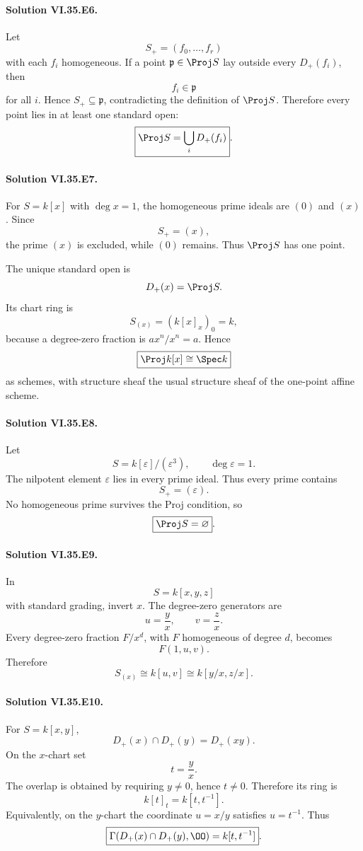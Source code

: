 \paragraph{Solution VI.35.E6.}
Let
\[
S_+=(f_0,\ldots,f_r)
\]
with each \(f_i\) homogeneous. If a point \(\mathfrak p\in\Proj S\) lay outside every \(D_+(f_i)\), then
\[
f_i\in\mathfrak p
\]
for all \(i\). Hence \(S_+\subseteq\mathfrak p\), contradicting the definition of \(\Proj S\). Therefore every
point lies in at least one standard open:
\[
\boxed{\Proj S=\bigcup_iD_+(f_i)}.
\]

\paragraph{Solution VI.35.E7.}
For \(S=k[x]\) with \(\deg x=1\), the homogeneous prime ideals are \((0)\) and \((x)\). Since
\[
S_+=(x),
\]
the prime \((x)\) is excluded, while \((0)\) remains. Thus \(\Proj S\) has one point.

The unique standard open is
\[
D_+(x)=\Proj S.
\]
Its chart ring is
\[
S_{(x)}=(k[x]_x)_0=k,
\]
because a degree-zero fraction is \(a x^n/x^n=a\). Hence
\[
\boxed{\Proj k[x]\cong\Spec k}
\]
as schemes, with structure sheaf the usual structure sheaf of the one-point affine scheme.

\paragraph{Solution VI.35.E8.}
Let
\[
S=k[\varepsilon]/(\varepsilon^3),
\qquad
\deg\varepsilon=1.
\]
The nilpotent element \(\varepsilon\) lies in every prime ideal. Thus every prime contains
\[
S_+=(\varepsilon).
\]
No homogeneous prime survives the Proj condition, so
\[
\boxed{\Proj S=\varnothing}.
\]

\paragraph{Solution VI.35.E9.}
In
\[
S=k[x,y,z]
\]
with standard grading, invert \(x\). The degree-zero generators are
\[
u=\frac yx,
\qquad
v=\frac zx.
\]
Every degree-zero fraction \(F/x^d\), with \(F\) homogeneous of degree \(d\), becomes
\[
F(1,u,v).
\]
Therefore
\[
\boxed{S_{(x)}\cong k[u,v]\cong k[y/x,z/x]}.
\]

\paragraph{Solution VI.35.E10.}
For \(S=k[x,y]\),
\[
D_+(x)\cap D_+(y)=D_+(xy).
\]
On the \(x\)-chart set
\[
t=\frac yx.
\]
The overlap is obtained by requiring \(y\neq0\), hence \(t\neq0\). Therefore its ring is
\[
k[t]_t=k[t,t^{-1}].
\]
Equivalently, on the \(y\)-chart the coordinate \(u=x/y\) satisfies \(u=t^{-1}\). Thus
\[
\boxed{\Gamma(D_+(x)\cap D_+(y),\OO)=k[t,t^{-1}]}.
\]


